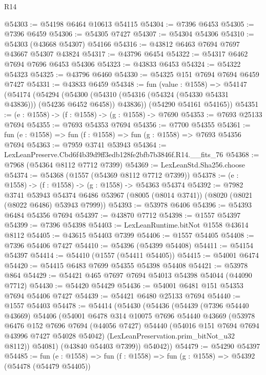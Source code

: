 \begin{lexlean}{R14}
\begin{coremodule}
@54303 := @54198 @6464 @10613 @54115
@54304 := @7396 @6453
@54305 := @7396 @6459
@54306 := @54305 @7427
@54307 := @54304 @54306
@54310 := @54303 (@43668 @54307) @54166
@54316 := @43812 @6463 @7694 @7697 @43667 @54307 @43824
@54317 := @43796 @6454
@54322 := @54317 @6462 @7694 @7696 @6453 @54306
@54323 := @43833 @6453
@54324 := @54322 @54323
@54325 := @43796 @6460
@54330 := @54325 @151 @7694 @7694 @6459 @7427
@54331 := @43833 @6459
@54348 := fun (value : @1558) =>
  @54147
    (@54174
      (@54294
        (@54300 (@54310 (@54316 (@54324 (@54330 @54331 @43836))) (@54236 @6452 @6458)) @43836))
      (@54290 @54161 @54165))
@54351 := (e : @1558) -> (f : @1558) -> (g : @1558) -> @7690
@54353 := @7693 @25133 @7694
@54355 := @7693 @54353 @7694
@54356 := @7700 @54355
@54361 := fun (e : @1558) => fun (f : @1558) => fun (g : @1558) => @7693 @54356 @7694
@54363 := @7959 @3741 @53943
@54364 := LexLeanPreserve.Cbd6f4b39d9ff3edb128fe2bfb7b3846f.R14.__fits_76
@54368 := @7968 (@54364 @8112 @7712 @7399)
@54369 := LexLeanStd.Sha256.choose
@54374 := @54368 (@1557 (@54369 @8112 @7712 @7399))
@54378 := (e : @1558) -> (f : @1558) -> (g : @1558) -> @54363 @54374
@54392 := @7982
    @3741
    @53943
    @54374
    @6486
    @53967
    (@8005 (@8014 @3741))
    (@8020 (@8021 (@8022 @6486) @53943 @7999))
@54393 := @53978 @6406
@54396 := @54393 @6484 @54356 @7694
@54397 := @43870 @7712
@54398 := @1557 @54397
@54399 := @7396 @54398
@54403 := LexLeanRuntime.bitNot @1558 @43614 @8112
@54405 := @43615 @54403 @7399
@54406 := @1557 @54405
@54408 := @7396 @54406 @7427
@54410 := @54396 (@54399 @54408)
@54411 := @54154 @54397
@54414 := @54410 (@1557 (@54411 @54405))
@54415 := @54001 @6474
@54420 := @54415 @6483 @7699 @54355 @54398 @54408
@54421 := @53978 @864
@54429 := @54421 @465 @7697 @7694 @54013 @54398 @54044 (@44090 @7712)
@54430 := @54420 @54429
@54436 := @54001 @6481 @151 @54353 @7694 @54406 @7427
@54439 := @54421 @6480 @25133 @7694
@54440 := @1557 @54403
@54478 := @54414
    (@54430
      (@54436
        (@54439
          (@7396 @54440 @43669)
          @54406
          (@54001
            @6478
            @314
            @10075
            @7696
            @54440
            @43669
            (@53978
              @6476
              @152
              @7696
              @7694
              (@44056 @7427)
              @54440
              (@54016 @151 @7694 @7694 @43996 @7427 @54028 @54042)
              (LexLeanPreservation.prim_bitNot_u32 @8112))
            @54081)
          (@43840 @54403 @7399))
        @54042))
@54479 := @54290 @54397
@54485 := fun (e : @1558) => fun (f : @1558) => fun (g : @1558) => @54392 (@54478 (@54479 @54405))

\end{coremodule}
\end{lexlean}
